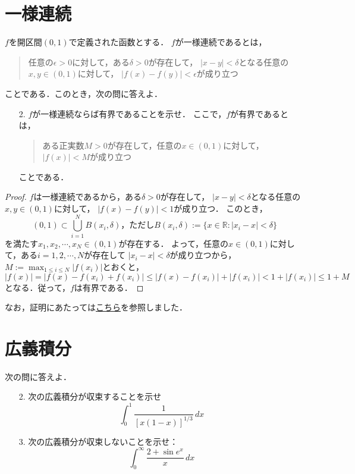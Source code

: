 \documentclass{jsarticle}
\theoremstyle{definition}
\begin{document}
\section{一様連続}

\begin{screen}
$f$を開区間$(0,1)$で定義された函数とする．
$f$が一様連続であるとは，
\begin{quote}
任意の$\epsilon>0$に対して，ある$\delta>0$が存在して，
$|x-y|<\delta$となる任意の$x,y\in(0,1)$に対して，
$|f(x)-f(y)|<\epsilon$が成り立つ
\end{quote}
ことである．このとき，次の問に答えよ．
\begin{itemize}
\item[2.]$f$が一様連続ならば有界であることを示せ．
ここで，$f$が有界であるとは，
\begin{quote}
ある正実数$M>0$が存在して，任意の$x\in(0,1)$に対して，
$|f(x)|<M$が成り立つ
\end{quote}
ことである．
\end{itemize}
\end{screen}

\begin{proof}
$f$は一様連続であるから，ある$\delta>0$が存在して，
$|x-y|<\delta$となる任意の$x,y\in(0,1)$に対して，
$|f(x)-f(y)|<1$が成り立つ．
このとき，
\[ (0,1)\subset\bigcup_{i=1}^NB(x_i,\delta)，
ただし B(x_i,\delta):=\{x\in\mathbb{R}:|x_i-x|<\delta\} \]
を満たす$x_1,x_2,\cdots,x_N\in(0,1)$が存在する．
よって，任意の$x\in(0,1)$に対して，ある$i=1,2,\cdots,N$が存在して
$|x_i-x|<\delta$が成り立つから，$M:=\max_{1\leq i\leq N}|f(x_i)|$とおくと，
\[ |f(x)|=|f(x)-f(x_i)+f(x_i)|\leq|f(x)-f(x_i)|+|f(x_i)|<1+|f(x_i)|\leq1+M \]
となる．従って，$f$は有界である．
\end{proof}

なお，証明にあたっては\href{https://math.stackexchange.com/questions/931887/how-to-prove-if-f-is-defined-and-uniformly-continuous-on-a-bounded-set-e-th}{こちら}を参照しました．

\section{広義積分}

\begin{screen}
次の問に答えよ．
\begin{itemize}
\item[2.]次の広義積分が収束することを示せ
\[ \int_0^1\frac{1}{[x(1-x)]^{1/3}}\,dx \]
\item[3.]次の広義積分が収束しないことを示せ：
\[ \int_0^\infty\frac{2+\sin{e^x}}{x}\,dx \]
\end{itemize}
\end{screen}
\end{document}
